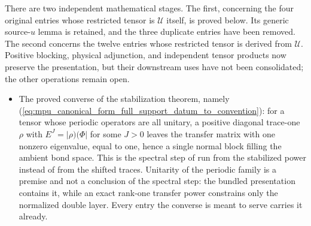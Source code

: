 \documentclass{article}
\begin{document}
There are two independent mathematical stages. The first, concerning the four
original entries whose restricted tensor is $\mathcal U$ itself, is proved
below. Its generic source-$u$ lemma is retained, and the three duplicate
entries have been removed. The second concerns the twelve entries whose
restricted tensor is derived from $\mathcal U$. Positive
blocking, physical adjunction, and independent tensor products now preserve
the presentation, but their downstream uses have not been consolidated; the
other operations remain open.

\begin{itemize}
    \item The proved converse of the stabilization theorem, namely
          (\ref{eq:mpu_canonical_form_full_support_datum_to_convention}): for
          a tensor whose periodic operators are all unitary, a positive
          diagonal trace-one $\rho$ with $E^{J}=\lvert\rho)(\Phi\rvert$ for
          some $J>0$ leaves the transfer matrix with one nonzero eigenvalue, equal
          to one, hence a single normal block filling the ambient bond space.
          This is the spectral step of
          \cite[lines~344--355]{Cirac2017MPU} run from the stabilized power
          instead of from the shifted traces. Unitarity of the periodic
          family is a premise and not a conclusion of the spectral step: the
          bundled presentation contains it, while an exact rank-one transfer
          power constrains only the normalized double layer. Every entry the
          converse is meant to serve carries it already.


\end{itemize}
\end{document}
